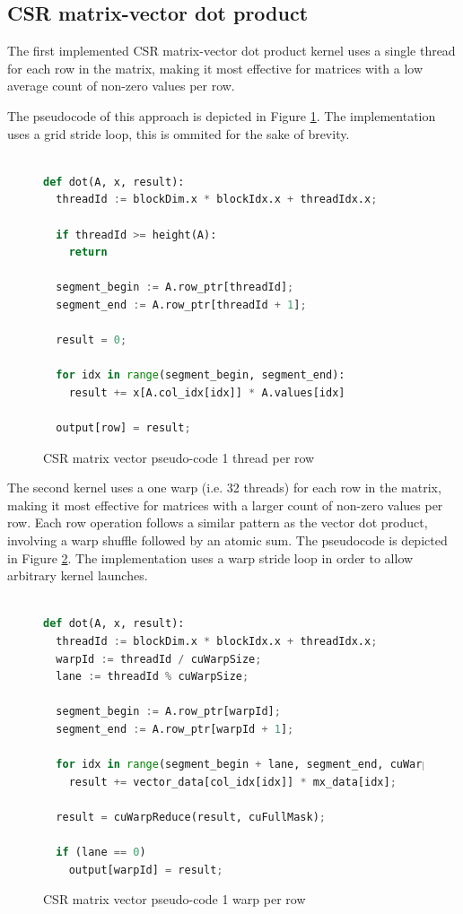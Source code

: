 \documentclass{article}
\begin{document}
\subsection{CSR matrix-vector dot product}
The first implemented CSR matrix-vector dot product kernel
uses a single thread for each row in the matrix,
making it most effective for matrices with a low average count of non-zero values per row.

The pseudocode of this approach is depicted in Figure \ref{code:csrv_1thread}.
The implementation uses a grid stride loop, this is ommited for the sake of brevity.

\begin{figure}[H]
\begin{lstlisting}[language=Python,mathescape=true]

def dot(A, x, result):
  threadId := blockDim.x * blockIdx.x + threadIdx.x;

  if threadId >= height(A):
    return

  segment_begin := A.row_ptr[threadId];
  segment_end := A.row_ptr[threadId + 1];
  
  result = 0;
  
  for idx in range(segment_begin, segment_end):
    result += x[A.col_idx[idx]] * A.values[idx]
  
  output[row] = result;

\end{lstlisting}
\caption{CSR matrix vector pseudo-code 1 thread per row}
\label{code:csrv_1thread}
\end{figure}

The second kernel uses a one warp (i.e. 32 threads) for each row in the matrix,
making it most effective for matrices with a larger count of non-zero values per row.
Each row operation follows a similar pattern as the vector dot product, involving a warp shuffle followed by an atomic sum.
The pseudocode is depicted in Figure \ref{code:csrv_warp}.
The implementation uses a warp stride loop in order to allow arbitrary kernel launches.

\begin{figure}[H]
\begin{lstlisting}[language=Python,mathescape=true]

def dot(A, x, result):
  threadId := blockDim.x * blockIdx.x + threadIdx.x;
  warpId := threadId / cuWarpSize;
  lane := threadId % cuWarpSize;

  segment_begin := A.row_ptr[warpId];
  segment_end := A.row_ptr[warpId + 1];

  for idx in range(segment_begin + lane, segment_end, cuWarpSize):
    result += vector_data[col_idx[idx]] * mx_data[idx];

  result = cuWarpReduce(result, cuFullMask);

  if (lane == 0)
    output[warpId] = result;

\end{lstlisting}
\caption{CSR matrix vector pseudo-code 1 warp per row}
\label{code:csrv_warp}
\end{figure}
\end{document}
